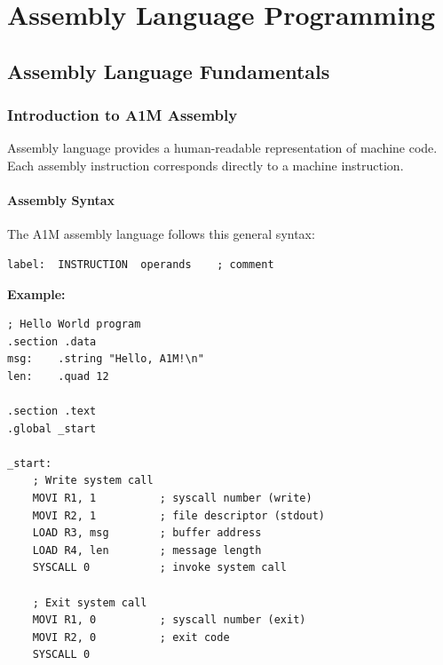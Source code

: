 \documentclass[12pt,a4paper,oneside]{book}
\begin{document}
\part{Assembly Language Programming}

\chapter{Assembly Language Fundamentals}

\section{Introduction to A1M Assembly}

Assembly language provides a human-readable representation of machine code. Each assembly instruction corresponds directly to a machine instruction.

\subsection{Assembly Syntax}

The A1M assembly language follows this general syntax:

\begin{verbatim}
label:  INSTRUCTION  operands    ; comment
\end{verbatim}

\textbf{Example:}
\begin{lstlisting}[style=assembly, caption={Simple Assembly Program}]
; Hello World program
.section .data
msg:    .string "Hello, A1M!\n"
len:    .quad 12

.section .text
.global _start

_start:
    ; Write system call
    MOVI R1, 1          ; syscall number (write)
    MOVI R2, 1          ; file descriptor (stdout)
    LOAD R3, msg        ; buffer address
    LOAD R4, len        ; message length
    SYSCALL 0           ; invoke system call
    
    ; Exit system call
    MOVI R1, 0          ; syscall number (exit)
    MOVI R2, 0          ; exit code
    SYSCALL 0
\end{lstlisting}
\end{document}
